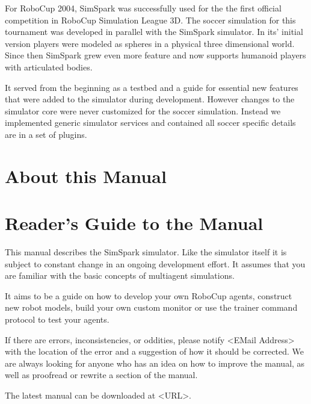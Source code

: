 
For RoboCup 2004, SimSpark was successfully used for the the first
official competition in RoboCup Simulation League 3D.  The soccer
simulation for this tournament was developed in parallel with the
SimSpark simulator. In its' initial version players were modeled as
spheres in a physical three dimensional world. Since then SimSpark
grew even more feature and now supports humanoid players with
articulated bodies.

It served from the beginning as a testbed and a guide for essential
new features that were added to the simulator during
development. However changes to the simulator core were never
customized for the soccer simulation. Instead we implemented generic
simulator services and contained all soccer specific details are in a
set of plugins.

\section{About this Manual}

\section{Reader's Guide to the Manual}


This manual describes the SimSpark simulator. Like the simulator
itself it is subject to constant change in an ongoing development
effort. It assumes that you are familiar with the basic concepts of
multiagent simulations.

It aims to be a guide on how to develop your own RoboCup agents,
construct new robot models, build your own custom monitor or use the
trainer command protocol to test your agents.

If there are errors, inconsistencies, or oddities, please notify
<EMail Address> with the location of the error and a suggestion of how
it should be corrected. We are always looking for anyone who has an
idea on how to improve the manual, as well as proofread or rewrite a
section of the manual.

The latest manual can be downloaded at <URL>.

